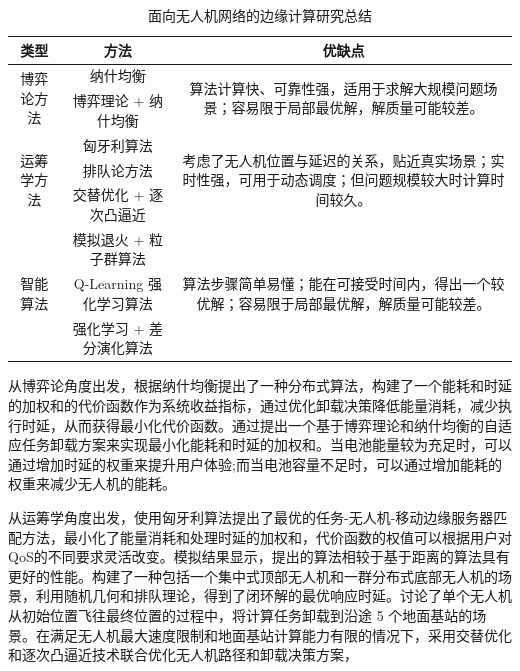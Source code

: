 \begin{table}[!htbp]
    \caption{面向无人机网络的边缘计算研究总结}
    \label{tab:面向无人机网络的边缘计算研究总结}
    \centering
    \begin{tabular}{c c c}
        \toprule
        \textbf{类型} & \textbf{方法} & \textbf{优缺点} \\
        \midrule
        \multirow{2}{*}{博弈论方法} & 纳什均衡\citep{messous2017ComputationOffloadingGamea} & \multirow{2}{15em}{算法计算快、可靠性强，适用于求解大规模问题场景；容易限于局部最优解，解质量可能较差。} \\
        & 博弈理论 + 纳什均衡\citep{peng2021DuoWuRenJiXieTongZhiBoChangJingXiaZiGuaYingRenWuXieZaiJueCe} & \\
        \cmidrule(lr){1-3}
        \multirow{3}{*}{运筹学方法} & 匈牙利算法\citep{kim2019OptimalTaskUAVEdgeMatchingb} & \multirow{3}{15em}{考虑了无人机位置与延迟的关系，贴近真实场景；实时性强，可用于动态调度；但问题规模较大时计算时间较久。} \\
        & 排队论方法\citep{zhang2020ResponseDelayOptimizationa} & \\
        & 交替优化 + 逐次凸逼近\citep{cao2018MobileEdgeComputinga} & \\
        \cmidrule(lr){1-3}
        \multirow{3}{*}{智能算法} & 模拟退火 + 粒子群算法\citep{zhu2018CooperativeComputationOffloadinga} & \multirow{3}{15em}{算法步骤简单易懂；能在可接受时间内，得出一个较优解；容易限于局部最优解，解质量可能较差。} \\
        & Q-Learning 强化学习算法\citep{kim2020MachineLearningBaseda} & \\
        & 强化学习 + 差分演化算法\citep{yang2020MultiUAVEnabledLoadBalanceMobileEdge} & \\
        \bottomrule
    \end{tabular}
\end{table}

从博弈论角度出发，\citet{messous2017ComputationOffloadingGamea}根据纳什均衡提出了一种分布式算法，构建了一个能耗和时延的加权和的代价函数作为系统收益指标，通过优化卸载决策降低能量消耗，减少执行时延，从而获得最小化代价函数。\citet{peng2021DuoWuRenJiXieTongZhiBoChangJingXiaZiGuaYingRenWuXieZaiJueCe}通过提出一个基于博弈理论和纳什均衡的自适应任务卸载方案来实现最小化能耗和时延的加权和。当电池能量较为充足时，可以通过增加时延的权重来提升用户体验;而当电池容量不足时，可以通过增加能耗的权重来减少无人机的能耗。

从运筹学角度出发，\citet{kim2019OptimalTaskUAVEdgeMatchingb}使用匈牙利算法提出了最优的任务-无人机-移动边缘服务器匹配方法，最小化了能量消耗和处理时延的加权和，代价函数的权值可以根据用户对QoS的不同要求灵活改变。模拟结果显示，提出的算法相较于基于距离的算法具有更好的性能。\citet{zhang2020ResponseDelayOptimizationa}构建了一种包括一个集中式顶部无人机和一群分布式底部无人机的场景，利用随机几何和排队理论，得到了闭环解的最优响应时延。\citet{cao2018MobileEdgeComputinga}讨论了单个无人机从初始位置飞往最终位置的过程中，将计算任务卸载到沿途 5 个地面基站的场景。在满足无人机最大速度限制和地面基站计算能力有限的情况下，采用交替优化和逐次凸逼近技术联合优化无人机路径和卸载决策方案，

